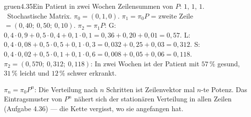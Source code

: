\begin{loesungkarte}{gruen}{4.35}{Ein Patient in zwei Wochen}
Zeilensummen von $P$: $1$, $1$, $1$. \checkmark\ Stochastische Matrix.
$\pi_0 = (0, 1, 0)$. $\pi_1 = \pi_0P$ = zweite Zeile $= (0{,}40;\ 0{,}50;\ 0{,}10)$.
$\pi_2 = \pi_1P$: G: $0{,}4\cdot0{,}9 + 0{,}5\cdot0{,}4 + 0{,}1\cdot0{,}1 = 0{,}36 + 0{,}20 + 0{,}01 = 0{,}57$. L: $0{,}4\cdot0{,}08 + 0{,}5\cdot0{,}5 + 0{,}1\cdot0{,}3 = 0{,}032 + 0{,}25 + 0{,}03 = 0{,}312$. S: $0{,}4\cdot0{,}02 + 0{,}5\cdot0{,}1 + 0{,}1\cdot0{,}6 = 0{,}008 + 0{,}05 + 0{,}06 = 0{,}118$. \\
$\pi_2 = (0{,}570;\ 0{,}312;\ 0{,}118)$: In zwei Wochen ist der Patient mit $57\,\%$ gesund, $31\,\%$ leicht und $12\,\%$ schwer erkrankt.
\begin{mitnehmen}\kastentext
$\pi_n = \pi_0P^{n}$: Die Verteilung nach $n$ Schritten ist Zeilenvektor mal $n$-te Potenz. Das Eintragsmuster von $P^{n}$ nähert sich der stationären Verteilung in allen Zeilen (Aufgabe 4.36) --- die Kette vergisst, wo sie angefangen hat.
\end{mitnehmen}
\end{loesungkarte}

